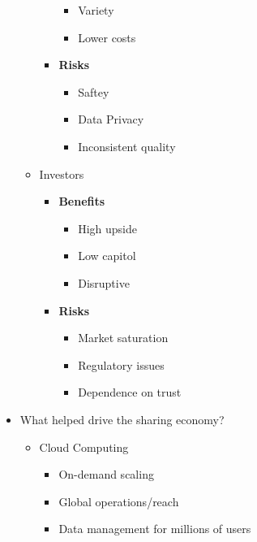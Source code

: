 \documentclass{report}
\begin{document}
\begin{itemize}
\begin{itemize}[label=$\circ$]
\begin{itemize}[label=$\circ$]
\begin{itemize}[label=$\circ$]
                        \item Variety
                        \item Lower costs
                    \end{itemize}
                \item \textbf{Risks}
                    \begin{itemize}[label=$\circ$]
                        \item Saftey
                        \item Data Privacy
                        \item Inconsistent quality
                    \end{itemize}
                \end{itemize}
            \item Investors
                \begin{itemize}[label=$\circ$]
                    \item \textbf{Benefits}
                        \begin{itemize}[label=$\circ$]
                            \item High upside
                            \item Low capitol
                            \item Disruptive
                        \end{itemize}
                    \item \textbf{Risks}
                        \begin{itemize}[label=$\circ$]
                            \item Market saturation
                            \item Regulatory issues
                            \item Dependence on trust
                        \end{itemize}
                \end{itemize}
        \end{itemize}
    \item What helped drive the sharing economy?
    \begin{itemize}[label=$\circ$]
        \item Cloud Computing
            \begin{itemize}
                \item On-demand scaling
                \item Global operations/reach
                \item Data management for millions of users

\end{itemize}
\end{itemize}
\end{itemize}
\end{document}
